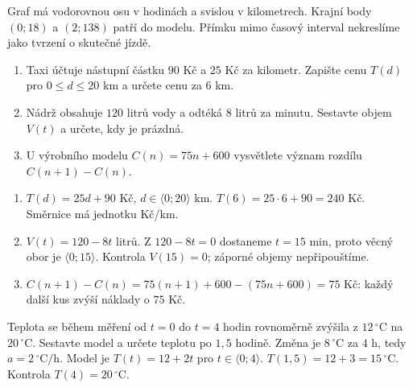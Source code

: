 \documentclass[11pt,a4paper]{article}
\begin{document}
Graf má vodorovnou osu v hodinách a svislou v kilometrech. Krajní body $(0;18)$ a $(2;138)$ patří do modelu. Přímku mimo časový interval nekreslíme jako tvrzení o skutečné jízdě.
\begin{zadaniReseniBox}
\begin{enumerate}[label=\alph*)]
\item Taxi účtuje nástupní částku $90$ Kč a $25$ Kč za kilometr. Zapište cenu $T(d)$ pro $0\le d\le20$ km a určete cenu za $6$ km.
\item Nádrž obsahuje $120$ litrů vody a odtéká $8$ litrů za minutu. Sestavte objem $V(t)$ a určete, kdy je prázdná.
\item U výrobního modelu $C(n)=75n+600$ vysvětlete význam rozdílu $C(n+1)-C(n)$.
\end{enumerate}
\tcblower
\begin{enumerate}[label=\alph*)]
\item $T(d)=25d+90$ Kč, $d\in\langle0;20\rangle$ km. $T(6)=25\cdot6+90=240$ Kč. Směrnice má jednotku Kč/km.
\item $V(t)=120-8t$ litrů. Z $120-8t=0$ dostaneme $t=15$ min, proto věcný obor je $\langle0;15\rangle$. Kontrola $V(15)=0$; záporné objemy nepřipouštíme.
\item $C(n+1)-C(n)=75(n+1)+600-(75n+600)=75$ Kč: každý další kus zvýší náklady o $75$ Kč.
\end{enumerate}
\end{zadaniReseniBox}
\begin{zadaniReseniBox}
Teplota se během měření od $t=0$ do $t=4$ hodin rovnoměrně zvýšila z $12\,^\circ\mathrm C$ na $20\,^\circ\mathrm C$. Sestavte model a určete teplotu po $1{,}5$ hodině.
\tcblower
Změna je $8\,^\circ\mathrm C$ za $4$ h, tedy $a=2\,^\circ\mathrm C/\mathrm h$. Model je $T(t)=12+2t$ pro $t\in\langle0;4\rangle$. $T(1{,}5)=12+3=15\,^\circ\mathrm C$. Kontrola $T(4)=20\,^\circ\mathrm C$.
\end{zadaniReseniBox}
\end{document}
